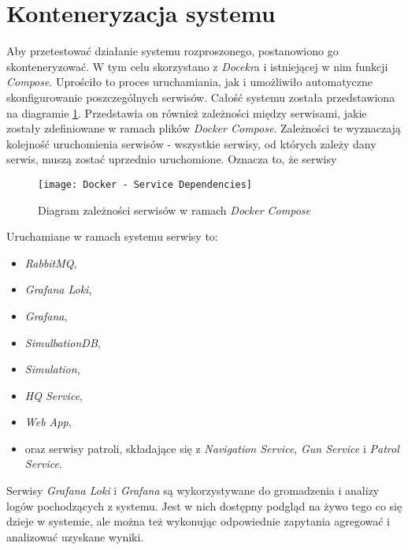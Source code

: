 \section{Konteneryzacja systemu}
\label{sec:konteneryzacjaSystemu}

\par Aby przetestować działanie systemu rozproszonego, postanowiono go skonteneryzować. W tym celu skorzystano z \emph{Docekr}a\cite{DOCKER_SITE} i istniejącej w nim funkcji \emph{Compose}\cite{DOCKER_COMPOSE_DOCS}. Uprościło to proces uruchamiania, jak i umożliwiło automatyczne skonfigurowanie poszczególnych serwisów. Całość systemu została przedstawiona na diagramie \ref{fig:dockerServiceRelations}. Przedstawia on również zależności między serwisami, jakie zostały zdefiniowane w ramach plików \emph{Docker Compose}. Zależności te wyznaczają kolejność uruchomienia serwisów - wszystkie serwisy, od których zależy dany serwis, muszą zostać uprzednio uruchomione. Oznacza to, że serwisy

\begin{figure}
    \centering
    \texttt{[image: Docker - Service Dependencies]}
    \caption{Diagram zależności serwisów w ramach \emph{Docker Compose}}
    \label{fig:dockerServiceRelations}
\end{figure}


\par Uruchamiane w ramach systemu serwisy to:
\begin{itemize}
    \item \emph{RabbitMQ},
    \item \emph{Grafana Loki},
    \item \emph{Grafana},
    \item \emph{SimulbationDB},
    \item \emph{Simulation},
    \item \emph{HQ Service},
    \item \emph{Web App},
    \item oraz serwisy patroli, składające się z \emph{Navigation Service}, \emph{Gun Service} i \emph{Patrol Service}.
\end{itemize}

\par Serwisy \emph{Grafana Loki} i \emph{Grafana} są wykorzystywane do gromadzenia i analizy logów pochodzących z systemu. Jest w nich dostępny podgląd na żywo tego co się dzieje w systemie, ale można też wykonując odpowiednie zapytania agregować i analizować uzyskane wyniki.

